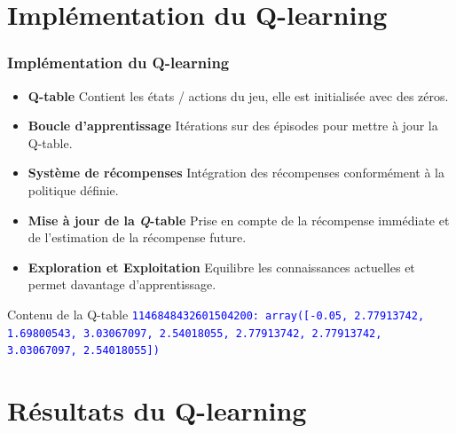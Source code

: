 \documentclass[
	11pt, %
]{beamer}
\begin{document}
\section{Implémentation du Q-learning}

\begin{frame}
	\frametitle{Implémentation du Q-learning}

	\begin{itemize}
        \item \textbf{Q-table} Contient les états / actions du jeu, elle est initialisée avec des zéros.
        \item \textbf{Boucle d'apprentissage} Itérations sur des épisodes pour mettre à jour la Q-table.
        \item \textbf{Système de récompenses} Intégration des récompenses conformément à la politique définie.
        \item \textbf{Mise à jour de la \textbf \textit Q-table} Prise en compte de la récompense immédiate et de l'estimation de la récompense future.
        \item \textbf{Exploration et Exploitation} Equilibre les connaissances actuelles et permet davantage d'apprentissage.
    \end{itemize}

    \begin{block}{Contenu de la Q-table}
        \textcolor{blue}{\texttt{1146848432601504200: array([-0.05, 2.77913742, 1.69800543, 3.03067097, 2.54018055, 2.77913742, 2.77913742, 3.03067097, 2.54018055])}}
    \end{block}

\end{frame}

\section{Résultats du Q-learning}
\end{document}
